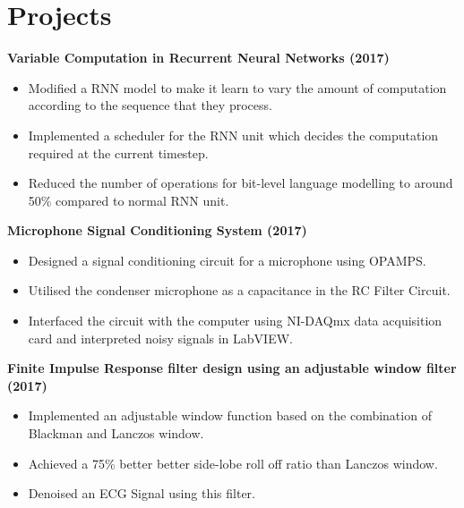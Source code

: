 \documentclass[a4paper]{article}
\newcommand{\resumeItem}[2]{
	\item\small{
		\textbf{#1}{ #2 \vspace{-5pt}}
	}
}
\newcommand{\resumeSubItem}[2]{\resumeItem{#1}{#2}\vspace{-1pt}}
\newcommand{\resumeSubItemOneArg}[1]{\item \small #1\vspace{-1pt}}
\newcommand{\resumeSubHeadingListStart}{\begin{itemize}[leftmargin=*]}
\newcommand{\resumeSubHeadingListEnd}{\end{itemize}}
\newcommand{\resumeItemListStart}{\begin{itemize} \vspace*{-5pt}}
\newcommand{\resumeItemListEnd}{\end{itemize}}
\begin{document}
\section{Projects}
\resumeSubHeadingListStart
\resumeSubItem{Variable Computation in Recurrent Neural Networks (2017)}{
    \resumeItemListStart
    \resumeSubItemOneArg{Modified a RNN model to make it learn to vary the amount of computation according to the sequence that they process.}
    \resumeSubItemOneArg{Implemented a scheduler for the RNN unit which decides the computation required at the current timestep.}
    \resumeSubItemOneArg{Reduced the number of operations for bit-level language modelling to around 50\% compared to normal RNN unit.}
    \resumeItemListEnd
    \vspace{-5pt}
    \resumeSubItem{Microphone Signal Conditioning System (2017)}{
        \resumeItemListStart
        \resumeSubItemOneArg{Designed a signal conditioning circuit for a microphone using OPAMPS.}
        \resumeSubItemOneArg{Utilised the condenser microphone as a capacitance in the RC Filter Circuit. }
        \resumeSubItemOneArg{Interfaced the circuit with the computer using NI-DAQmx data acquisition card and interpreted noisy signals in LabVIEW.}
        \resumeItemListEnd
    }
    \resumeSubItem{Finite Impulse Response filter design using an adjustable window filter  (2017)}{
        \resumeItemListStart
        \resumeSubItemOneArg{Implemented an adjustable window function based on the combination of Blackman and Lanczos window.}
        \resumeSubItemOneArg{Achieved a 75\% better better side-lobe roll off ratio than Lanczos window.}
        \resumeSubItemOneArg{Denoised an ECG Signal using this filter.}
        \resumeItemListEnd
    }

}

\vspace{5pt}
\resumeSubHeadingListEnd



\end{document}
